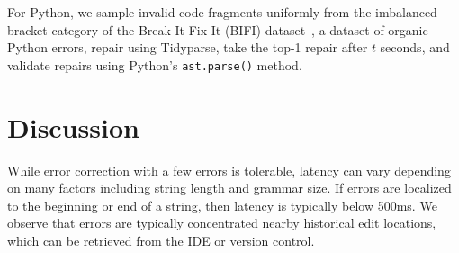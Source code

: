 \documentclass[sigplan,review,anonymous,acmsmall]{acmart}\settopmatter{printfolios=false,printccs=false,printacmref=false}
\begin{document}
\noindent For Python, we sample invalid code fragments uniformly from the imbalanced bracket category of the Break-It-Fix-It (BIFI) dataset~\cite{yasunaga2021break}, a dataset of organic Python errors, repair using Tidyparse, take the top-1 repair after $t$ seconds, and validate repairs using Python's \texttt{ast.parse()} method.

%
%
%
%
%
%

\section{Discussion}\label{sec:discussion}

While error correction with a few errors is tolerable, latency can vary depending on many factors including string length and grammar size. If errors are localized to the beginning or end of a string, then latency is typically below 500ms. We observe that errors are typically concentrated nearby historical edit locations, which can be retrieved from the IDE or version control.
\end{document}
